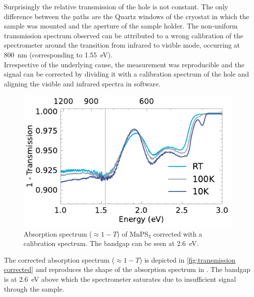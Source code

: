 \documentclass[
	twoside,
	parskip=half,
	a4paper,
]{scrbook}
\begin{document}
Surprisingly the relative transmission of the hole is not constant.
The only difference between the paths are the Quartz windows of the cryostat in which the sample was mounted and the aperture of the sample holder.
The non-uniform transmission spectrum observed can be attributed to a wrong calibration of the spectrometer around the transition from infrared to visible mode, occurring at \SI{800}{nm} (corresponding to \SI{1.55}{eV}).\\
Irrespective of the underlying cause, the measurement was reproducible and the signal can be corrected by dividing it with a calibration spectrum of the hole and aligning the visible and infrared spectra in software.
\begin{figure}
	\centering
	\includegraphics{../figures/2024-03-15 MnPS3 transmission processed.pdf }
	\caption{Absorption spectrum ($\approx 1- T$) of MnPS$_3$ corrected with a calibration spectrum. The bandgap can be seen at \SI{2.6}{eV}.}
	\label{fig:transmission corrected}
\end{figure}
The corrected absorption spectrum ($\approx 1 - T$) is depicted in \autoref{fig:transmission corrected} and reproduces the shape of the absorption spectrum in \cite{MnPS3_transmission}.
The bandgap is at \SI{2.6}{eV} above which the spectrometer saturates due to insufficient signal through the sample.
\end{document}
